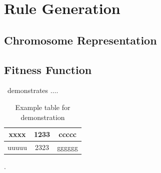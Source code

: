 \section{Rule Generation}
\subsection{Chromosome Representation}
\subsection{Fitness Function}


~demonstrates $\ldots$.


\begin{table}[!ht]
	\label{Table:l1}
	\centering
	\begin{tabular}{|c|c|c|}
		\hline
		xxxx & 1233 & ccccc \\
		\hline
		uuuuu & 2323 & gggggg \\
		\hline
	\end{tabular}
	\caption{Example table for demonstration}
\end{table}

.

\begin{landscape}
\end{landscape}